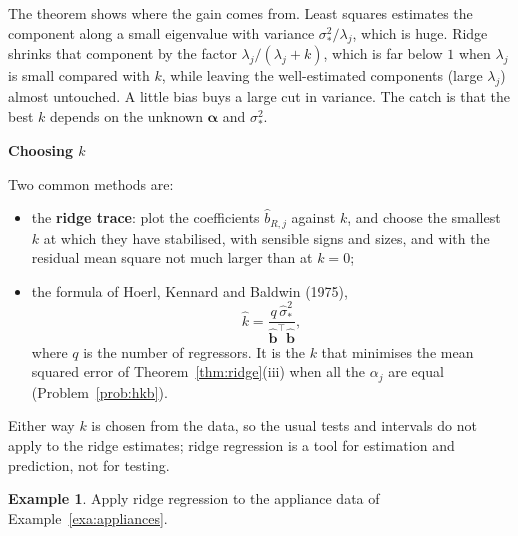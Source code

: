 \documentclass[11pt,a4paper]{article}
\numberwithin{equation}{section}
\theoremstyle{definition}
\newtheorem{exa}[thm]{Example}
\newcommand{\subhead}[1]{%
  \par\medskip\noindent\textbf{#1}\par\nobreak\smallskip}
\begin{document}
The theorem shows where the gain comes from. Least squares estimates the component along a small
eigenvalue with variance $\sigma_*^2/\lambda_j$, which is huge. Ridge shrinks that component by the factor
$\lambda_j/(\lambda_j + k)$, which is far below $1$ when $\lambda_j$ is small compared with $k$, while leaving the
well-estimated components (large $\lambda_j$) almost untouched. A little bias buys a large cut in variance.
The catch is that the best $k$ depends on the unknown $\boldsymbol\alpha$ and $\sigma_*^2$.

\subhead{Choosing $k$}
Two common methods are:
\begin{itemize}
\item the \textbf{ridge trace}: plot the coefficients $\hat b_{R,j}$ against $k$, and choose the smallest $k$
at which they have stabilised, with sensible signs and sizes, and with the residual mean square not much
larger than at $k = 0$;
\item the formula of Hoerl, Kennard and Baldwin (1975),
\[
\hat k = \frac{q\,\hat\sigma_*^2}{\hat{\mathbf{b}}^\top\hat{\mathbf{b}}} ,
\]
where $q$ is the number of regressors. It is the $k$ that minimises the mean squared error of
Theorem~\ref{thm:ridge}(iii) when all the $\alpha_j$ are equal (Problem~\ref{prob:hkb}).
\end{itemize}
Either way $k$ is chosen from the data, so the usual tests and intervals do not apply to the ridge
estimates; ridge regression is a tool for estimation and prediction, not for testing.

\begin{exa}\label{exa:appliances-ridge}
Apply ridge regression to the appliance data of Example~\ref{exa:appliances}.
\end{exa}
\end{document}
